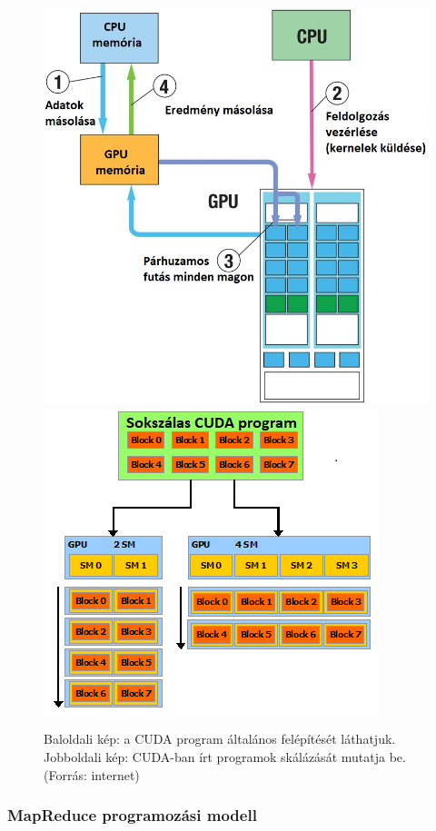 \documentclass[11pt,a4paper]{article}
\numberwithin{equation}{subsection}
\numberwithin{figure}{section}
\begin{document}
\begin{figure}[H]
\centering
\includegraphics[scale=0.32]{pic/prog/cudamodel}
\includegraphics[scale=0.8]{pic/prog/cudascale}
\caption{Baloldali kép: a CUDA program általános felépítését láthatjuk. Jobboldali kép: CUDA-ban írt programok skálázását mutatja be. (Forrás: internet) }
\label{fig:cuda}
\end{figure}

\subsubsection{MapReduce programozási modell}\label{sec:MapReduce}
\end{document}
